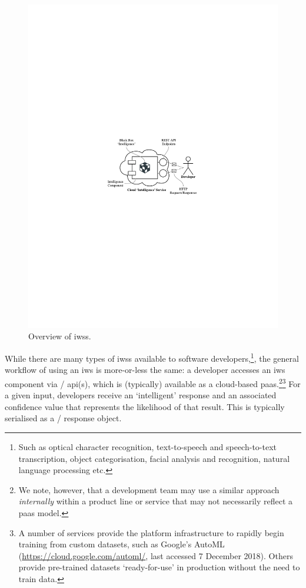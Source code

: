 \begin{figure}[h!]
\centering
\caption[Overview of intelligent web services]{Overview of \glspl{iws}.}
\label{fig:introduction:cloud-intelliegnce-service}
\includegraphics{cloud-intelliegnce-service}
\end{figure}


While there are many types of \glspl{iws} available to software developers,\footnote{Such as optical character recognition, text-to-speech and speech-to-text transcription, object categorisation, facial analysis and recognition, natural language processing etc.}, the general workflow of using an \gls{iws} is more-or-less the same: a developer accesses an \gls{iws} component via / \gls{api}(s), which is (typically) available as a cloud-based \gls{paas}.\footnote{We note, however, that a development team may use a similar approach \textit{internally} within a product line or service that may not necessarily reflect a \gls{paas} model.}\footnote{A number of services provide the platform infrastructure to rapidly begin training from custom datasets, such as Google's AutoML (\url{https://cloud.google.com/automl/}, last accessed 7 December 2018). Others provide pre-trained datasets `ready-for-use' in production without the need to train data.} For a given input, developers receive an `intelligent' response and an associated confidence value that represents the likelihood of that result. This is typically serialised as a / response object. 

